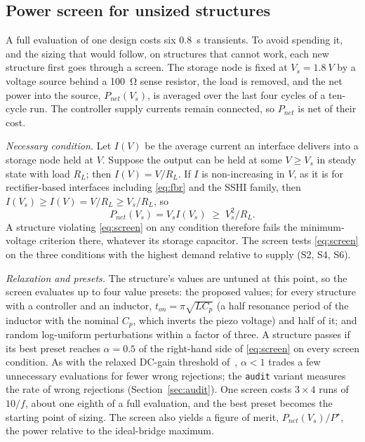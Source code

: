 \documentclass[journal]{IEEEtran}
\begin{document}
\subsection{Power screen for unsized structures}\label{sec:screen}
A full evaluation of one design costs six \SI{0.8}{s} transients. To avoid spending it, and the sizing
that would follow, on structures that cannot work, each new structure first goes through a screen. The
storage node is fixed at $V_s = \SI{1.8}{V}$ by a voltage source behind a \SI{100}{\ohm} sense resistor,
the load is removed, and the net power into the source, $P_{net}(V_s)$, is averaged over the last four
cycles of a ten-cycle run. The controller supply currents remain connected, so $P_{net}$ is net of
their cost.

\emph{Necessary condition.} Let $I(V)$ be the average current an interface delivers into a storage node
held at $V$. Suppose the output can be held at some $V\ge V_s$ in steady state with load $R_L$; then
$I(V) = V/R_L$. If $I$ is non-increasing in $V$, as it is for rectifier-based interfaces including
\eqref{eq:fbr} and the SSHI family, then $I(V_s) \ge I(V) = V/R_L \ge V_s/R_L$, so
\begin{equation}\label{eq:screen}
P_{net}(V_s) = V_s I(V_s) \;\ge\; V_s^2/R_L .
\end{equation}
A structure violating \eqref{eq:screen} on any condition therefore fails the minimum-voltage criterion
there, whatever its storage capacitor. The screen tests \eqref{eq:screen} on the three conditions with
the highest demand relative to supply (S2, S4, S6).

\emph{Relaxation and presets.} The structure's values are untuned at this point, so the screen evaluates
up to four value presets: the proposed values; for every structure with a controller and an inductor,
$t_{on} = \pi\sqrt{L C_p}$ (a half resonance period of the inductor with the nominal $C_p$, which inverts
the piezo voltage) and half of it; and random log-uniform perturbations within a factor of three. A
structure passes if its best preset reaches $\alpha = 0.5$ of the right-hand side of \eqref{eq:screen} on
every screen condition. As with the relaxed DC-gain threshold of~\cite{zhao2022drl}, $\alpha<1$ trades a
few unnecessary evaluations for fewer wrong rejections; the \texttt{audit} variant measures the rate of
wrong rejections (Section~\ref{sec:audit}). One screen costs $3\times 4$ runs of $10/f$, about one
eighth of a full evaluation, and the best preset becomes the starting point of sizing. The screen also
yields a figure of merit, $P_{net}(V_s)/P^\star$, the power relative to the ideal-bridge maximum.
\end{document}
